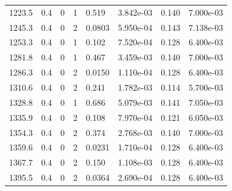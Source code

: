 \documentclass[preview]{standalone}
\begin{document}
{{{\begin{tabular}{L{1.2cm}C{1.2cm} C{0.3cm}C{0.5cm} C{1.4cm}C{1.4cm} C{1.4cm}C{1.4cm}}
  1223.5  &   0.4  & 0     &  1 &  0.519  & 3.842e-03  & 0.140 &  7.000e-03   \\ 
  1245.3  &   0.4  & 0     &  2 &  0.0803  & 5.950e-04  & 0.143 &  7.138e-03   \\ 
  1253.3  &   0.4  & 0     &  1 &  0.102  & 7.520e-04  & 0.128 &  6.400e-03   \\ 
  1281.8  &   0.4  & 0     &  1 &  0.467  & 3.459e-03  & 0.140 &  7.000e-03   \\ 
  1286.3  &   0.4  & 0     &  2 &  0.0150  & 1.110e-04  & 0.128 &  6.400e-03   \\ 
  1310.6  &   0.4  & 0     &  2 &  0.241  & 1.782e-03  & 0.114 &  5.700e-03   \\ 
  1328.8  &   0.4  & 0     &  1 &  0.686  & 5.079e-03  & 0.141 &  7.050e-03   \\ 
  1335.9  &   0.4  & 0     &  2 &  0.108  & 7.970e-04  & 0.121 &  6.050e-03   \\ 
  1354.3  &   0.4  & 0     &  2 &  0.374  & 2.768e-03  & 0.140 &  7.000e-03   \\ 
  1359.6  &   0.4  & 0     &  2 &  0.0231  & 1.710e-04  & 0.128 &  6.400e-03   \\ 
  1367.7  &   0.4  & 0     &  2 &  0.150  & 1.108e-03  & 0.128 &  6.400e-03   \\ 
  1395.5  &   0.4  & 0     &  2 &  0.0364  & 2.690e-04  & 0.128 &  6.400e-03   \\ 
\hline 
\end{tabular} 

}}}
\end{document}
